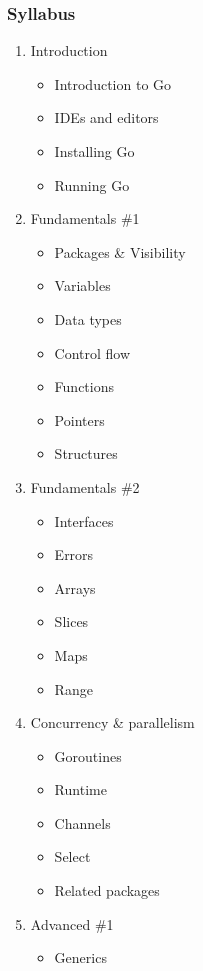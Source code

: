 \documentclass[
  digital,
  color,
  oneside,
  nosansbold,
  nocolorbold,
  lof,
  lot,
]{fithesis4}
\begin{document}
\subsubsection{Syllabus}

\begin{enumerate}
    \item Introduction
    \begin{itemize}
        \item Introduction to Go
        \item IDEs and editors
        \item Installing Go
        \item Running Go
    \end{itemize}
    \item Fundamentals \#1
    \begin{itemize}
        \item Packages \& Visibility
        \item Variables
        \item Data types
        \item Control flow
        \item Functions
        \item Pointers
        \item Structures
    \end{itemize}
    \item Fundamentals \#2
    \begin{itemize}
        \item Interfaces
        \item Errors
        \item Arrays
        \item Slices
        \item Maps
        \item Range
    \end{itemize}
    \item Concurrency \& parallelism
    \begin{itemize}
        \item Goroutines
        \item Runtime
        \item Channels
        \item Select
        \item Related packages
    \end{itemize}
    \item Advanced \#1
    \begin{itemize}
        \item Generics

\end{itemize}
\end{enumerate}
\end{document}
